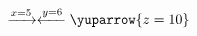 \documentclass[preview]{standalone}
\begin{document}
\begin{align*}
\xrightarrow{x=5} \xleftarrow{y=6} \yuparrow{z=10}
\end{align*}
\end{document}
